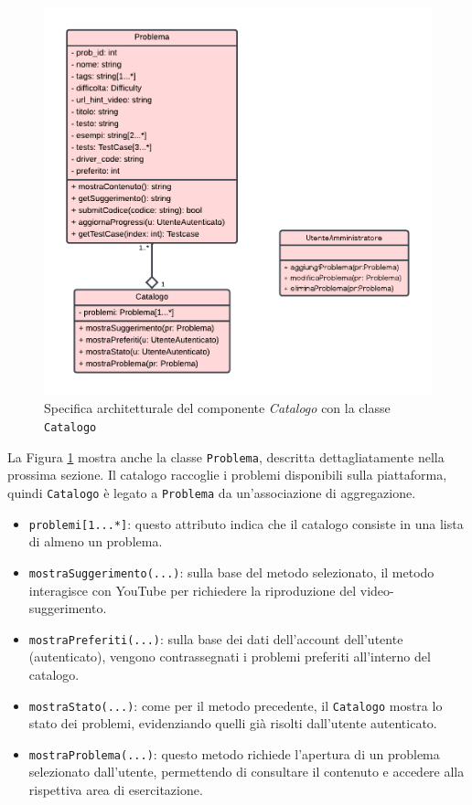 \documentclass[11pt, a4paper]{article}
\theoremstyle{definition} %
\begin{document}
\begin{figure}[H]
\centering
\hspace*{-1.2cm}
\includegraphics[scale = 0.9]{materiale/class-catalogo.pdf}
\caption{Specifica architetturale del componente \textit{Catalogo} con la classe \texttt{Catalogo}}
\label{catalog}
\end{figure}
\noindent La Figura \ref{catalog} mostra anche la classe \texttt{Problema},
descritta dettagliatamente nella prossima sezione. Il catalogo
raccoglie i problemi disponibili sulla piattaforma, quindi \texttt{Catalogo}
è legato a \texttt{Problema} da un'associazione di aggregazione.


\begin{itemize}
    \item \texttt{problemi[1...*]}: questo attributo indica che il catalogo
    consiste in una lista di almeno un problema.

    \item \texttt{mostraSuggerimento(...)}: sulla base del metodo selezionato, il metodo
    interagisce con YouTube per richiedere la riproduzione del video-suggerimento.

    \item \texttt{mostraPreferiti(...)}: sulla base dei dati dell'account
    dell'utente (autenticato), vengono contrassegnati i problemi preferiti
    all'interno del catalogo.

    \item \texttt{mostraStato(...)}: come per il metodo precedente, il
    \texttt{Catalogo} mostra lo stato dei problemi, evidenziando quelli
    già risolti dall'utente autenticato.

    \item \texttt{mostraProblema(...)}: questo metodo richiede l'apertura
    di un problema selezionato dall'utente, permettendo di consultare il
    contenuto e accedere alla rispettiva area di esercitazione.
\end{itemize}
\end{document}
